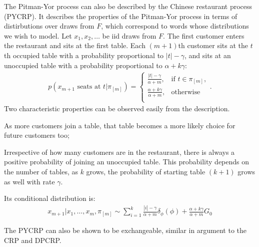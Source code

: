 The Pitman-Yor process can also be described by the Chinese restaurant process (PYCRP). It describes the properties of the Pitman-Yor process in terms of distirbutions over draws from $F$, which correspond to words whose distributions we wish to model. Let $x_1, x_2,\ldots$ be iid draws from $F$. The first customer enters the restaurant and sits at the first table. Each $(m+1)$th customer sits at the $t$th occupied table with a probability proportional to $|t|-\gamma$, and sits at an unoccupied table with a probability proportional to $\alpha+k\gamma$:
\begin{align}
	p(x_{m+1}\text{ seats at }t|\pi_{[m]}) = 
    	\begin{cases}
        	\frac{|t|-\gamma}{\alpha+m}, & \text{if }t\in\pi_{[m]},\\
           	\frac{\alpha+k\gamma}{\alpha+m}, & \text{otherwise}\\ 
        \end{cases}.
\end{align}
Two characteristic properties can be observed easily from the description. \begin{enumerate*}
\item As more customers join a table, that table becomes a more likely choice for future customers too;
\item Irrespective of how many customers are in the restaurant, there is always a positive probability of joining an unoccupied table. This probability depends on the number of tables, as $k$ grows, the probability of starting table $(k+1)$ grows as well with rate $\gamma$.
\end{enumerate*}

Its conditional distribution is:
\begin{align}\label{eq:pycrpconddist}
	x_{m+1}|x_1,\ldots,x_m, \pi_{[m]} \sim \sum_{i=1}^k \frac{|i|-\gamma}{\alpha+m}\delta_\phi(\phi) + \frac{\alpha+k\gamma}{\alpha+m}G_0
\end{align}

The PYCRP can also be shown to be exchangeable, similar in argument to the CRP and DPCRP. 

